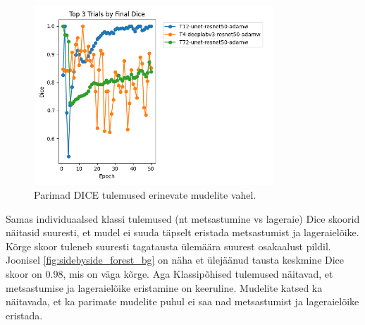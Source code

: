 \begin{figure}[H]
    \centering
    \includegraphics[width=0.8\textwidth]{figures/top3_dice.png}
    \caption{Parimad DICE tulemused erinevate mudelite vahel.}
    \label{fig:segmentation_results}
\end{figure}

Samas individuaalsed klassi tulemused (nt metsastumine vs lageraie) Dice skoorid näitasid suuresti, et mudel ei suuda
täpselt eristada metsastumist ja lageraielõike. Kõrge skoor tuleneb suuresti tagatausta ülemäära suurest osakaalust pildil. Joonisel \ref{fig:sidebyside_forest_bg} on näha et ülejäänud tausta keskmine Dice skoor on 0.98, mis on väga kõrge. Aga Klassipõhised tulemused näitavad, et metsastumise ja lageraielõike eristamine on keeruline. Mudelite katsed ka näitavada, et ka parimate mudelite puhul ei saa nad metsastumist ja lageraielõike eristada.

